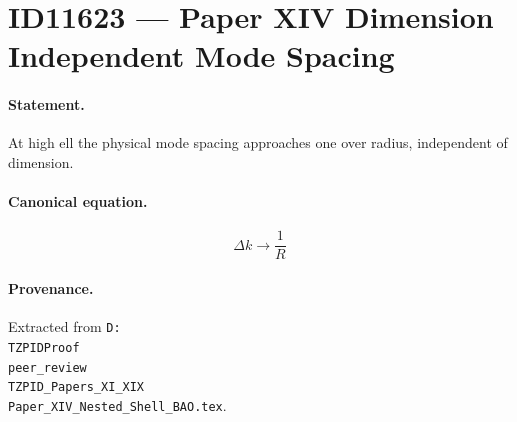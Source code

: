 \section*{ID11623 --- Paper XIV Dimension Independent Mode Spacing}

\paragraph{Statement.}
At high ell the physical mode spacing approaches one over radius, independent of dimension.

\paragraph{Canonical equation.}
\[
\Delta k\to\frac{1}{R}
\]

\paragraph{Provenance.}
Extracted from \texttt{D:\\TZPIDProof\\peer\_review\\TZPID\_Papers\_XI\_XIX\\Paper\_XIV\_Nested\_Shell\_BAO.tex}.
